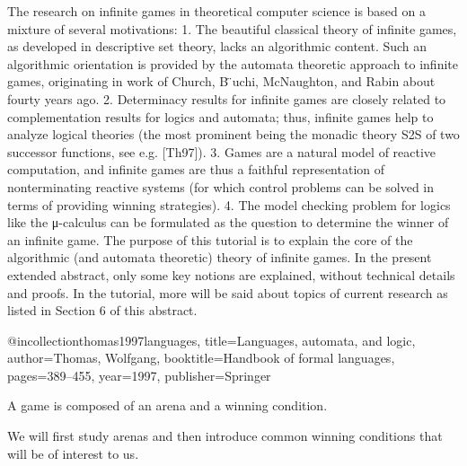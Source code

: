 The research on infinite games in theoretical computer science is based on a
mixture of several motivations:
1. The beautiful classical theory of infinite games, as developed in descriptive
set theory, lacks an algorithmic content. Such an algorithmic orientation is
provided by the automata theoretic approach to infinite games, originating
in work of Church, B ̈uchi, McNaughton, and Rabin about fourty years ago.
2. Determinacy results for infinite games are closely related to complementation
results for logics and automata; thus, infinite games help to analyze logical
theories (the most prominent being the monadic theory S2S of two successor
functions, see e.g. [Th97]).
3. Games are a natural model of reactive computation, and infinite games are
thus a faithful representation of nonterminating reactive systems (for which
control problems can be solved in terms of providing winning strategies).
4. The model checking problem for logics like the μ-calculus can be formulated
as the question to determine the winner of an infinite game.
The purpose of this tutorial is to explain the core of the algorithmic (and
automata theoretic) theory of infinite games. In the present extended abstract,
only some key notions are explained, without technical details and proofs. In the
tutorial, more will be said about topics of current research as listed in Section 6
of this abstract.

@incollection{thomas1997languages,
  title={Languages, automata, and logic},
  author={Thomas, Wolfgang},
  booktitle={Handbook of formal languages},
  pages={389--455},
  year={1997},
  publisher={Springer}
}


\fi


A game is composed of an arena and a winning condition.

We will ﬁrst study
arenas and
 then introduce common winning conditions that will be of interest to us.




